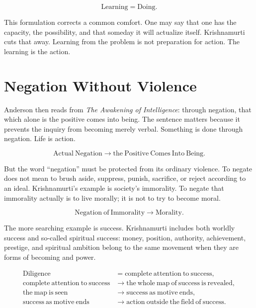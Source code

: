 \documentclass[11pt,oneside]{book}
\begin{document}
\begin{equation}
\mathrm{Learning}=\mathrm{Doing}.
\end{equation}

This formulation corrects a common comfort. One may say that one has the capacity, the possibility, and that someday it will actualize itself. Krishnamurti cuts that away. Learning from the problem is not preparation for action. The learning is the action.

\section{Negation Without Violence}

Anderson then reads from \emph{The Awakening of Intelligence}: through negation, that which alone is the positive comes into being. The sentence matters because it prevents the inquiry from becoming merely verbal. Something is done through negation. Life is action.

\begin{equation}
\mathrm{Actual\ Negation}
\longrightarrow
\mathrm{the\ Positive\ Comes\ Into\ Being}.
\end{equation}

But the word ``negation'' must be protected from its ordinary violence. To negate does not mean to brush aside, suppress, punish, sacrifice, or reject according to an ideal. Krishnamurti's example is society's immorality. To negate that immorality actually is to live morally; it is not to try to become moral.

\begin{equation}
\mathrm{Negation\ of\ Immorality}
\longrightarrow
\mathrm{Morality}.
\end{equation}

The more searching example is success. Krishnamurti includes both worldly success and so-called spiritual success: money, position, authority, achievement, prestige, and spiritual ambition belong to the same movement when they are forms of becoming and power.

\begin{align}
\mathrm{Diligence}
&=
\mathrm{complete\ attention\ to\ success},\\
\mathrm{complete\ attention\ to\ success}
&\longrightarrow
\mathrm{the\ whole\ map\ of\ success\ is\ revealed},\\
\mathrm{the\ map\ is\ seen}
&\longrightarrow
\mathrm{success\ as\ motive\ ends},\\
\mathrm{success\ as\ motive\ ends}
&\longrightarrow
\mathrm{action\ outside\ the\ field\ of\ success}.
\end{align}
\end{document}
